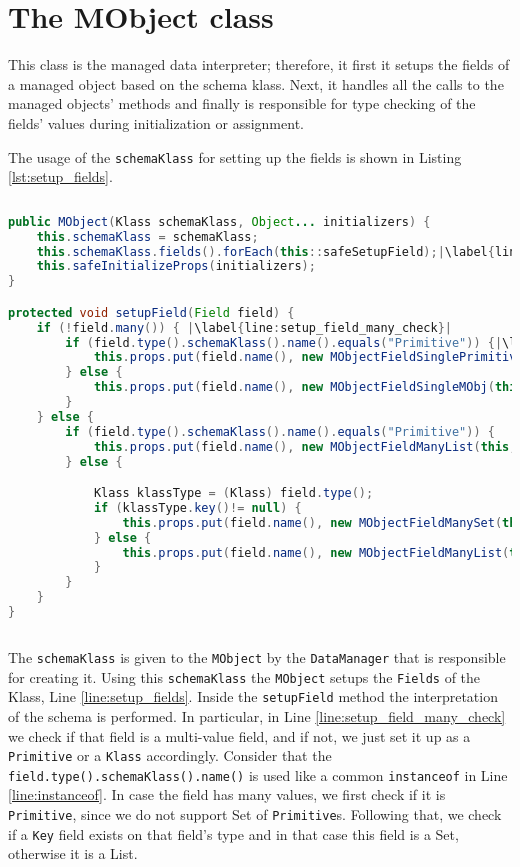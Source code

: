 
\chapter{The MObject class}\label{apdx:MObject}
This class is the managed data interpreter; therefore, it first it setups the fields of a managed object based on the schema klass.
Next, it handles all the calls to the managed objects' methods and finally is responsible for type checking of the fields' values during initialization or assignment.

The usage of the \texttt{schemaKlass} for setting up the fields is shown in Listing \ref{lst:setup_fields}.

\begin{sourcecode}
	\begin{lstlisting}[language=Java, escapechar=|]
public MObject(Klass schemaKlass, Object... initializers) {
	this.schemaKlass = schemaKlass;
	this.schemaKlass.fields().forEach(this::safeSetupField);|\label{line:setup_fields}|
	this.safeInitializeProps(initializers);
}

protected void setupField(Field field) {
	if (!field.many()) { |\label{line:setup_field_many_check}|
		if (field.type().schemaKlass().name().equals("Primitive")) {|\label{line:instanceof}|
			this.props.put(field.name(), new MObjectFieldSinglePrimitive(this, field));
		} else {
			this.props.put(field.name(), new MObjectFieldSingleMObj(this, field));
		}
	} else {
		if (field.type().schemaKlass().name().equals("Primitive")) {
			this.props.put(field.name(), new MObjectFieldManyList(this, field));
		} else {

			Klass klassType = (Klass) field.type();
			if (klassType.key()!= null) {
				this.props.put(field.name(), new MObjectFieldManySet(this, field));
			} else {
				this.props.put(field.name(), new MObjectFieldManyList(this, field));
			}
		}
	}
}
	\end{lstlisting}
	\caption{MObject: setup fields}
	\label{lst:setup_fields}
\end{sourcecode}

The \texttt{schemaKlass} is given to the \texttt{MObject} by the \texttt{DataManager} that is responsible for creating it.
Using this \texttt{schemaKlass} the \texttt{MObject} setups the \texttt{Fields} of the Klass, Line \ref{line:setup_fields}.
Inside the \texttt{setupField} method the interpretation of the schema is performed.
In particular, in Line \ref{line:setup_field_many_check} we check if that field is a multi-value field, and if not, we just set it up as a \texttt{Primitive} or a \texttt{Klass} accordingly. 
Consider that the \texttt{field.type().schemaKlass().name()} is used like a common \texttt{instanceof} in Line \ref{line:instanceof}.
In case the field has many values, we first check if it is \texttt{Primitive}, since we do not support Set of \texttt{Primitive}s.
Following that, we check if a \texttt{Key} field exists on that field's type and in that case this field is a Set, otherwise it is a List.

